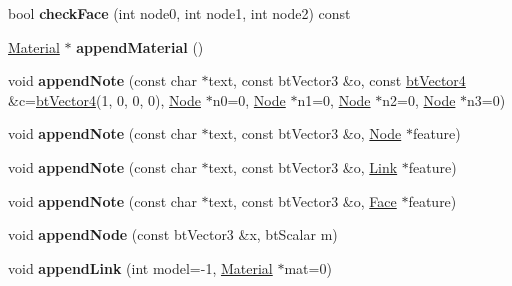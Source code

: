 \begin{DoxyCompactItemize}
\item 
\hypertarget{classbt_soft_body_a6802ec1cd5bd9718e09ed9da92537b2d}{bool {\bfseries check\+Face} (int node0, int node1, int node2) const }\label{classbt_soft_body_a6802ec1cd5bd9718e09ed9da92537b2d}

\item 
\hypertarget{classbt_soft_body_a9f982578b7de055039a75e5904152b6d}{\hyperlink{structbt_soft_body_1_1_material}{Material} $\ast$ {\bfseries append\+Material} ()}\label{classbt_soft_body_a9f982578b7de055039a75e5904152b6d}

\item 
\hypertarget{classbt_soft_body_aa672f32eb59763f5175c7f823615db98}{void {\bfseries append\+Note} (const char $\ast$text, const bt\+Vector3 \&o, const \hyperlink{classbt_vector4}{bt\+Vector4} \&c=\hyperlink{classbt_vector4}{bt\+Vector4}(1, 0, 0, 0), \hyperlink{structbt_soft_body_1_1_node}{Node} $\ast$n0=0, \hyperlink{structbt_soft_body_1_1_node}{Node} $\ast$n1=0, \hyperlink{structbt_soft_body_1_1_node}{Node} $\ast$n2=0, \hyperlink{structbt_soft_body_1_1_node}{Node} $\ast$n3=0)}\label{classbt_soft_body_aa672f32eb59763f5175c7f823615db98}

\item 
\hypertarget{classbt_soft_body_a5c4f5428c421191e55babc34b4672924}{void {\bfseries append\+Note} (const char $\ast$text, const bt\+Vector3 \&o, \hyperlink{structbt_soft_body_1_1_node}{Node} $\ast$feature)}\label{classbt_soft_body_a5c4f5428c421191e55babc34b4672924}

\item 
\hypertarget{classbt_soft_body_aa71ccf539cb5b4e79d6b07a6f503af65}{void {\bfseries append\+Note} (const char $\ast$text, const bt\+Vector3 \&o, \hyperlink{structbt_soft_body_1_1_link}{Link} $\ast$feature)}\label{classbt_soft_body_aa71ccf539cb5b4e79d6b07a6f503af65}

\item 
\hypertarget{classbt_soft_body_a15285f0ac6eb1d24a25b58cd05eefb39}{void {\bfseries append\+Note} (const char $\ast$text, const bt\+Vector3 \&o, \hyperlink{structbt_soft_body_1_1_face}{Face} $\ast$feature)}\label{classbt_soft_body_a15285f0ac6eb1d24a25b58cd05eefb39}

\item 
\hypertarget{classbt_soft_body_a6259e16009323fc8e936966b1fba1324}{void {\bfseries append\+Node} (const bt\+Vector3 \&x, bt\+Scalar m)}\label{classbt_soft_body_a6259e16009323fc8e936966b1fba1324}

\item 
\hypertarget{classbt_soft_body_ad632d23c33118bc061ac171a0a99ad20}{void {\bfseries append\+Link} (int model=-\/1, \hyperlink{structbt_soft_body_1_1_material}{Material} $\ast$mat=0)}\label{classbt_soft_body_ad632d23c33118bc061ac171a0a99ad20}


\end{DoxyCompactItemize}
